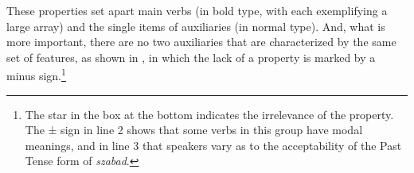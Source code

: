 \documentclass[output=paper]{langsci/langscibook}
\begin{document}
\ea\label{ex:27.12} 
    \z
\z

These properties set apart main verbs (in bold type, with each exemplifying a
large array) and the single items of auxiliaries (in normal type). And, what is
more important, there are no two auxiliaries that are characterized by the same
set of features, as shown in , in which the lack of a
property is marked by a minus sign.\footnote{The star in the box at the bottom
    indicates the irrelevance of the property. The ± sign in line 2 shows that
    some verbs in this group have modal meanings, and in line 3 that speakers
    vary as to the acceptability of the Past Tense form of \emph{szabad}.}
\end{document}
